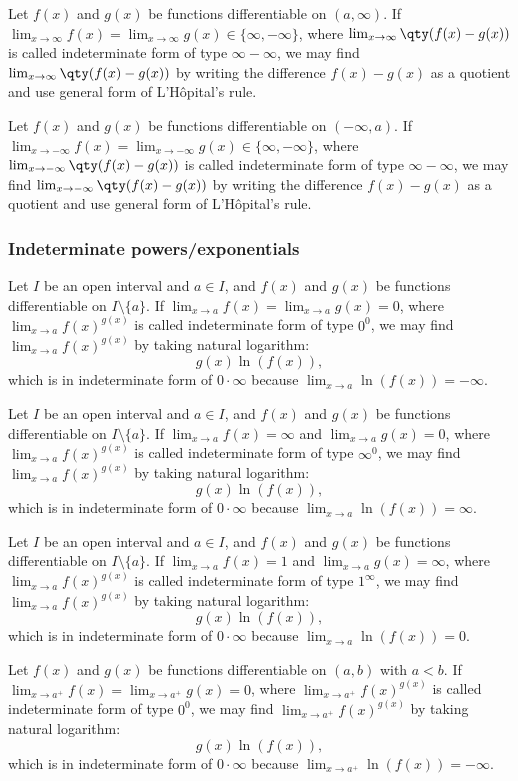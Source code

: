 \documentclass[a4paper,12pt]{report}
\begin{document}
\begin{itemize}
\begin{itemize}
Let $f(x)$ and $g(x)$ be functions differentiable on $(a,\infty)$. If $\lim_{x\to\infty}f(x)=\lim_{x\to\infty}g(x)\in\{\infty,-\infty\}$, where $\lim_{x\to\infty}\qty(f(x)-g(x))$ is called indeterminate form of type $\infty-\infty$, we may find $\lim_{x\to\infty}\qty(f(x)-g(x))$ by writing the difference $f(x)-g(x)$ as a quotient and use general form of L'Hôpital's rule.

Let $f(x)$ and $g(x)$ be functions differentiable on $(-\infty,a)$. If $\lim_{x\to -\infty}f(x)=\lim_{x\to -\infty}g(x)\in\{\infty,-\infty\}$, where $\lim_{x\to -\infty}\qty(f(x)-g(x))$ is called indeterminate form of type $\infty-\infty$, we may find $\lim_{x\to -\infty}\qty(f(x)-g(x))$ by writing the difference $f(x)-g(x)$ as a quotient and use general form of L'Hôpital's rule.
\subsubsection{Indeterminate powers/exponentials}
Let $I$ be an open interval and $a\in I$, and $f(x)$ and $g(x)$ be functions differentiable on $I\setminus\{a\}$. If $\lim_{x\to a}f(x)=\lim_{x\to a}g(x)=0$, where $\lim_{x\to a}f(x)^{g(x)}$ is called indeterminate form of type $0^0$, we may find $\lim_{x\to a}f(x)^{g(x)}$ by taking natural logarithm:
\[g(x)\ln(f(x)),\]
which is in indeterminate form of $0\cdot\infty$ because $\lim_{x\to a}\ln(f(x))=-\infty$.

Let $I$ be an open interval and $a\in I$, and $f(x)$ and $g(x)$ be functions differentiable on $I\setminus\{a\}$. If $\lim_{x\to a}f(x)=\infty$ and $\lim_{x\to a}g(x)=0$, where $\lim_{x\to a}f(x)^{g(x)}$ is called indeterminate form of type $\infty^0$, we may find $\lim_{x\to a}f(x)^{g(x)}$ by taking natural logarithm:
\[g(x)\ln(f(x)),\]
which is in indeterminate form of $0\cdot\infty$ because $\lim_{x\to a}\ln(f(x))=\infty$.

Let $I$ be an open interval and $a\in I$, and $f(x)$ and $g(x)$ be functions differentiable on $I\setminus\{a\}$. If $\lim_{x\to a}f(x)=1$ and $\lim_{x\to a}g(x)=\infty$, where $\lim_{x\to a}f(x)^{g(x)}$ is called indeterminate form of type $1^{\infty}$, we may find $\lim_{x\to a}f(x)^{g(x)}$ by taking natural logarithm:
\[g(x)\ln(f(x)),\]
which is in indeterminate form of $0\cdot\infty$ because $\lim_{x\to a}\ln(f(x))=0$.

Let $f(x)$ and $g(x)$ be functions differentiable on $(a,b)$ with $a<b$. If $\lim_{x\to a^+}f(x)=\lim_{x\to a^+}g(x)=0$, where $\lim_{x\to a^+}f(x)^{g(x)}$ is called indeterminate form of type $0^0$, we may find $\lim_{x\to a^+}f(x)^{g(x)}$ by taking natural logarithm:
\[g(x)\ln(f(x)),\]
which is in indeterminate form of $0\cdot\infty$ because $\lim_{x\to a^+}\ln(f(x))=-\infty$.


\end{itemize}
\end{itemize}
\end{document}
